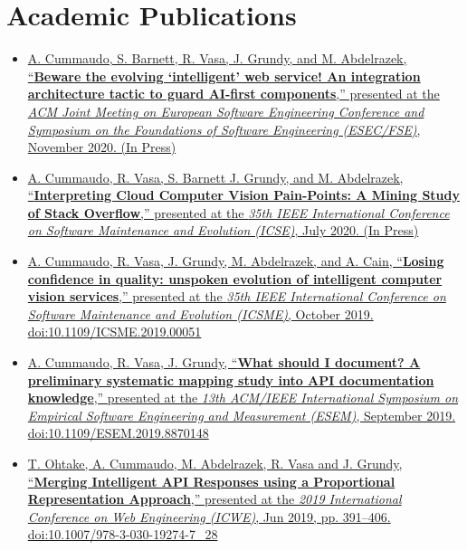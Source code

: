 \section{Academic Publications}

\medskip
{
\footnotesize
\begin{itemize}
  \itemsep-1.5em
  \item \href{https://www.alexcu.me/goto/phd-fse2020/}{A. Cummaudo, S. Barnett, R. Vasa, J. Grundy, and M. Abdelrazek, ``\textbf{Beware the evolving `intelligent' web service! An integration architecture tactic to guard AI-first components},'' presented at the \textit{ACM Joint Meeting on European Software Engineering Conference and Symposium on the Foundations of Software Engineering (ESEC/FSE)}, November 2020. (In Press)}\\
  \item \href{https://www.alexcu.me/goto/phd-icse2020/}{A. Cummaudo, R. Vasa, S. Barnett J. Grundy, and M. Abdelrazek, ``\textbf{Interpreting Cloud Computer Vision Pain-Points: A Mining Study of Stack Overflow},'' presented at the \textit{35th IEEE International Conference on Software Maintenance and Evolution (ICSE)}, July 2020. (In Press)}\\
  \item \href{https://doi.org/10.1109/ICSME.2019.00051}{A. Cummaudo, R. Vasa, J. Grundy, M. Abdelrazek, and A. Cain, ``\textbf{Losing confidence in quality: unspoken evolution of intelligent computer vision services},'' presented at the \textit{35th IEEE International Conference on Software Maintenance and Evolution (ICSME)}, October 2019. doi:10.1109/ICSME.2019.00051}\\
  \item \href{https://doi.org/10.1109/ESEM.2019.8870148}{A. Cummaudo, R. Vasa, J. Grundy, ``\textbf{What should I document? A preliminary systematic mapping study into API documentation knowledge},'' presented at the \textit{13th ACM/IEEE International Symposium on Empirical Software Engineering and Measurement (ESEM)}, September 2019. doi:10.1109/ESEM.2019.8870148}\\
  \item \href{https://doi.org/10.1007/978-3-030-19274-7_28}{T. Ohtake, A. Cummaudo, M. Abdelrazek, R. Vasa and J. Grundy, ``\textbf{Merging Intelligent API Responses using a Proportional Representation Approach},'' presented at the \textit{2019 International Conference on Web Engineering (ICWE)}, Jun 2019, pp. 391--406. doi:10.1007/978-3-030-19274-7\_28}\\

\end{itemize}}
